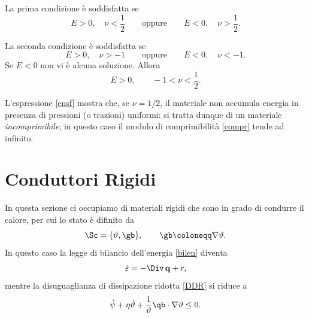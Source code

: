 La prima condizione è soddisfatta se
\begin{equation}
E>0, \quad \nu <\frac 12 \qquad \textrm{oppure} \qquad E<0, \quad \nu >\frac12.
\end{equation}

La seconda condizione è soddisfatta se
\begin{equation}
E>0, \quad \nu>-1 \qquad \textrm{oppure} \qquad E<0, \quad \nu <-1.
\end{equation}
Se $E<0$ non vi è alcuna soluzione. Allora
\begin{equation}
E>0, \qquad -1<\nu< \frac12.
\end{equation}

\begin{remark}
L'espressione \eqref{ensf} mostra  che, se $\nu=1/2$, il materiale non accumula energia in presenza di pressioni (o trazioni) uniformi: si tratta dunque di un materiale \textit{incomprimibile}; in questo caso il modulo di comprimibilità \eqref{compr} tende ad  infinito.


\end{remark}




\section{Conduttori Rigidi}
In questa sezione ci occupiamo di materiali rigidi che sono in grado di condurre il calore, per cui lo stato  è difinito da
\begin{equation}
\Sc=\{\vartheta, \gb\}, \qquad  \gb\coloneqq \nabla\vartheta.
\end{equation}
In questo caso la legge di bilancio dell'energia \eqref{bilen} diventa
\begin{equation}\label{bilrh}
	\dot{\varepsilon} = - \Div \, \mathbf{q} + r,
\end{equation}
mentre la disuguaglianza di dissipazione ridotta \eqref{DDR} si riduce a 
\begin{equation}\label{DDRq}
\dot{\psi}+\eta \dot{\vartheta}+\frac{1}{\vartheta}\qb \cdot \nabla \vartheta\leq 0.
\end{equation}

